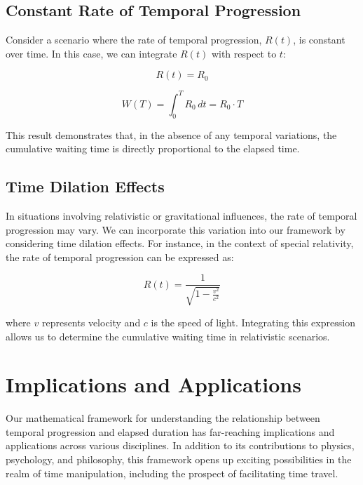 \documentclass{article}
\begin{document}
\subsection{Constant Rate of Temporal Progression}

Consider a scenario where the rate of temporal progression, $R(t)$, is constant over time. In this case, we can integrate $R(t)$ with respect to $t$:

\begin{equation}
    R(t) = R_0
\end{equation}

\begin{equation}
    W(T) = \int_0^T R_0 \, dt = R_0 \cdot T
\end{equation}

This result demonstrates that, in the absence of any temporal variations, the cumulative waiting time is directly proportional to the elapsed time.

\subsection{Time Dilation Effects}

In situations involving relativistic or gravitational influences, the rate of temporal progression may vary. We can incorporate this variation into our framework by considering time dilation effects. For instance, in the context of special relativity, the rate of temporal progression can be expressed as:

\begin{equation}
    R(t) = \frac{1}{\sqrt{1 - \frac{v^2}{c^2}}}
\end{equation}

where $v$ represents velocity and $c$ is the speed of light. Integrating this expression allows us to determine the cumulative waiting time in relativistic scenarios.

\section{Implications and Applications}

Our mathematical framework for understanding the relationship between temporal progression and elapsed duration has far-reaching implications and applications across various disciplines. In addition to its contributions to physics, psychology, and philosophy, this framework opens up exciting possibilities in the realm of time manipulation, including the prospect of facilitating time travel.
\end{document}

